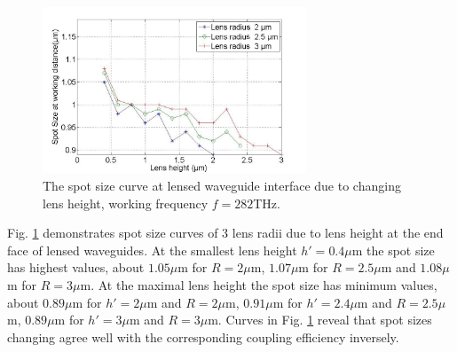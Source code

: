 \begin{figure}[!ht]
\centering
\includegraphics[width=0.7\textwidth]{bilder/spot_fix_lens_radium_hxx}
\caption{The spot size curve at lensed waveguide interface due to changing lens height, working frequency $f=282$THz.}
\label{fig:lensed_guide_spot_size_curve}
\end{figure}  
Fig. \ref{fig:lensed_guide_spot_size_curve} demonstrates spot size curves of 3 lens radii due to lens height at the end face of lensed waveguides. At the smallest lens height $h'=0.4\mu$m the spot size has highest values, about $1.05\mu$m for $R=2\mu$m, $1.07\mu$m for $R=2.5\mu$m and $1.08\mu$m for $R=3\mu$m. At the maximal lens height the spot size has minimum values, about $0.89\mu$m for $h'=2\mu$m and $R=2\mu$m, $0.91\mu$m for $h'=2.4\mu$m and $R=2.5\mu$m, $0.89\mu$m for $h'=3\mu$m and $R=3\mu$m. Curves in Fig. \ref{fig:lensed_guide_spot_size_curve} reveal that spot sizes changing agree well with the corresponding coupling efficiency inversely.\\
